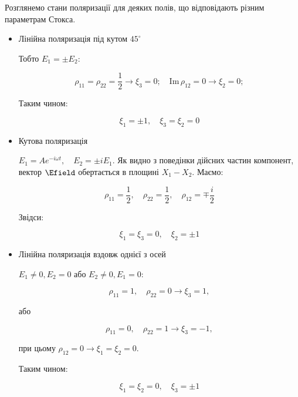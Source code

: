 Розглянемо стани поляризації для деяких полів, що відповідають різним параметрам Стокса.

\begin{itemize}

\item Лінійна поляризація під кутом $45^{\circ}$

Тобто \(E_1 = \pm E_2\):

\begin{equation*}
\rho_{11} = \rho_{22} = \frac{1}{2} \rightarrow \xi_3 = 0; \quad \text{Im} \, \rho_{12} = 0 \rightarrow \xi_2 = 0;
\end{equation*}

Таким чином:

\begin{equation*}
\xi_1 = \pm 1, \quad \xi_3 = \xi_2 = 0
\end{equation*}



\item  Кутова поляризація

\(E_1 = A e^{-i\omega t}, \quad E_2 = \pm i E_1\). Як видно з поведінки дійсних частин компонент, вектор \(\Efield\) обертається в площині \(X_1 -
X_2\). Маємо:

\begin{equation*}
\rho_{11} = \frac{1}{2}, \quad \rho_{22} = \frac{1}{2}, \quad \rho_{12} = \mp \frac{i}{2}
\end{equation*}

Звідси:

\begin{equation*}
\xi_1 = \xi_3 = 0, \quad \xi_2 = \pm 1
\end{equation*}

\item Лінійна поляризація вздовж однієї з осей

\(E_1 \neq 0, E_2 = 0\) або \(E_2 \neq 0, E_1 = 0\):

\begin{equation*}
\rho_{11} = 1, \quad \rho_{22} = 0 \rightarrow \xi_3 = 1,
\end{equation*}

або

\begin{equation*}
\rho_{11} = 0, \quad \rho_{22} = 1 \rightarrow \xi_3 = -1,
\end{equation*}

при цьому \(\rho_{12} = 0 \rightarrow \xi_1 = \xi_2 = 0\).

Таким чином:

\begin{equation*}
\xi_1 = \xi_2 = 0, \quad \xi_3 = \pm 1
\end{equation*}

\end{itemize}


